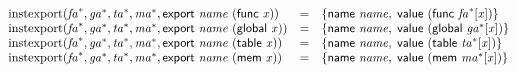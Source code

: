 $$
\begin{array}{@{}lcl@{}l@{}}
{\mathrm{instexport}}({{\mathit{fa}}^\ast}, {{\mathit{ga}}^\ast}, {{\mathit{ta}}^\ast}, {{\mathit{ma}}^\ast}, \mathsf{export}~{\mathit{name}}~(\mathsf{func}~{\mathit{x}})) &=& \{ \begin{array}[t]{@{}l@{}}
\mathsf{name}~{\mathit{name}},\; \mathsf{value}~(\mathsf{func}~{{\mathit{fa}}^\ast}{}[{\mathit{x}}]) \}\end{array} &  \\
{\mathrm{instexport}}({{\mathit{fa}}^\ast}, {{\mathit{ga}}^\ast}, {{\mathit{ta}}^\ast}, {{\mathit{ma}}^\ast}, \mathsf{export}~{\mathit{name}}~(\mathsf{global}~{\mathit{x}})) &=& \{ \begin{array}[t]{@{}l@{}}
\mathsf{name}~{\mathit{name}},\; \mathsf{value}~(\mathsf{global}~{{\mathit{ga}}^\ast}{}[{\mathit{x}}]) \}\end{array} &  \\
{\mathrm{instexport}}({{\mathit{fa}}^\ast}, {{\mathit{ga}}^\ast}, {{\mathit{ta}}^\ast}, {{\mathit{ma}}^\ast}, \mathsf{export}~{\mathit{name}}~(\mathsf{table}~{\mathit{x}})) &=& \{ \begin{array}[t]{@{}l@{}}
\mathsf{name}~{\mathit{name}},\; \mathsf{value}~(\mathsf{table}~{{\mathit{ta}}^\ast}{}[{\mathit{x}}]) \}\end{array} &  \\
{\mathrm{instexport}}({{\mathit{fa}}^\ast}, {{\mathit{ga}}^\ast}, {{\mathit{ta}}^\ast}, {{\mathit{ma}}^\ast}, \mathsf{export}~{\mathit{name}}~(\mathsf{mem}~{\mathit{x}})) &=& \{ \begin{array}[t]{@{}l@{}}
\mathsf{name}~{\mathit{name}},\; \mathsf{value}~(\mathsf{mem}~{{\mathit{ma}}^\ast}{}[{\mathit{x}}]) \}\end{array} &  \\
\end{array}
$$

\vspace{1ex}

